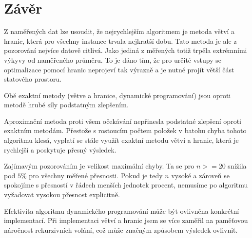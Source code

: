 \documentclass{article}
\begin{document}
\section{Závěr}

Z naměřených dat lze usoudit, že nejrychlejším algoritmem je metoda větví a hranic, která pro všechny instance trvala nejkratší dobu.
Tato metoda je ale z pozorování nejvíce datově citlivá. Jako jediná z měřených totiž trpěla extrémními výkyvy od naměřeného průměru.
To je dáno tím, že pro určité vstupy se optimalizace pomocí hranic neprojeví tak výrazně a je nutné projít větší část statového prostoru.

Obě exaktní metody (větve a hranice, dynamické programování) jsou oproti metodě hrubé síly podstatným zlepšením.

Aproximační metoda proti všem očekávání nepřinesla podstatné zlepšení oproti exaktním metodám.
Přestože s rostoucím počtem položek v batohu chyba tohoto algoritmu klesá, vyplatí se stále využít exaktní metodu větví a hranic, která je rychlejší a poskytuje přesný výsledek.

Zajímavým pozorováním je velikost maximální chyby.
Ta se pro $n >= 20$ snížila pod $5 \%$ pro všechny měřené přesnosti.
Pokud je tedy $n$ vysoké a zároveň se spokojíme s přesností v řádech menších jednotek procent, nemusíme po algoritmu vyžadovat vysokou přesnost explicitně.

Efektivita algoritmu dynamického programování může být ovlivněna konkrétní implementací.
Při implementaci větví a hranic jsem se více zaměřil na paměťovou náročnost rekurzivních volání, což může značným způsobem výsledek ovlivnit.
\end{document}
